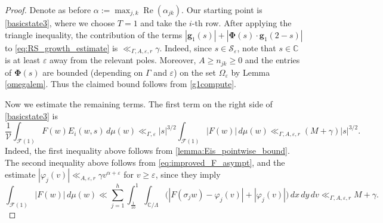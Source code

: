 \documentclass[12pt,reqno]{amsart}
\numberwithin{equation}{section}
\renewcommand{\Re}{\operatorname{Re}}
\newcommand{\C}{\mathbb{C}}
\begin{document}
\begin{proof}
    Denote as before $\alpha:=\max_{j,k} \Re(\alpha_{jk})$. Our starting point is \eqref{basicstate3}, where we choose $T = 1$ and take the $i$-th row. After applying the triangle inequality, the contribution of the terms $|{\boldsymbol{g}_1(s)}| + |{\boldsymbol{\Phi}(s) \cdot \boldsymbol{g}_1(2-s)}|$ to \eqref{eq:RS_growth_estimate} is $\ll_{\Gamma, A, \varepsilon,r} \gamma$. Indeed, since $s \in \mathcal{S}_{\varepsilon}$, note that $s \in \C$ is at least $\varepsilon$ away from the relevant poles. Moreover, $A \geq n_{jk} \geq 0$ and the entries of $\boldsymbol{\Phi}(s)$ are bounded (depending on $\Gamma$ and $\varepsilon$) on the set $\Omega_{\varepsilon}$ by Lemma \ref{omegalem}.
Thus the claimed bound follows from \eqref{g1compute}.
    
  Now we estimate the remaining terms. The first term on the right side of \eqref{basicstate3} is
    \begin{equation*}
        \frac{1}{\mathcal{V}} \int_{\mathcal{F}(1)} F(w) E_i(w, s) \, d\mu(w) \ll_{\Gamma, \varepsilon} |{s}|^{3/2} \int_{\mathcal{F}(1)} |F(w)| \, d\mu(w) \ll_{\Gamma, A, \varepsilon,r} (M+\gamma) |{s}|^{3/2}.
    \end{equation*}
    Indeed, the first inequality above follows from \cref{lemma:Eis_pointwise_bound}. The second inequality above follows from \eqref{eq:improved_F_asympt}, and the estimate $|{\varphi_{j}(v)}| \ll_{A, \varepsilon,r} \gamma v^{\alpha + \varepsilon}$ for $v\geq \varepsilon$, since they imply
    \begin{equation*}
        \int_{\mathcal{F}(1)} |F(w)| \, d\mu(w) \ll \sum_{j=1}^h \int_{\frac{1}{10}}^1 \int_{\C/\Lambda} \big( |{F(\sigma_j w) - \varphi_j(v)}| + |{\varphi_j(v)}|\big) \, dx \, dy \, dv
        \ll_{\Gamma, A, \varepsilon,r} M + \gamma.
    \end{equation*}
    

\end{proof}
\end{document}
